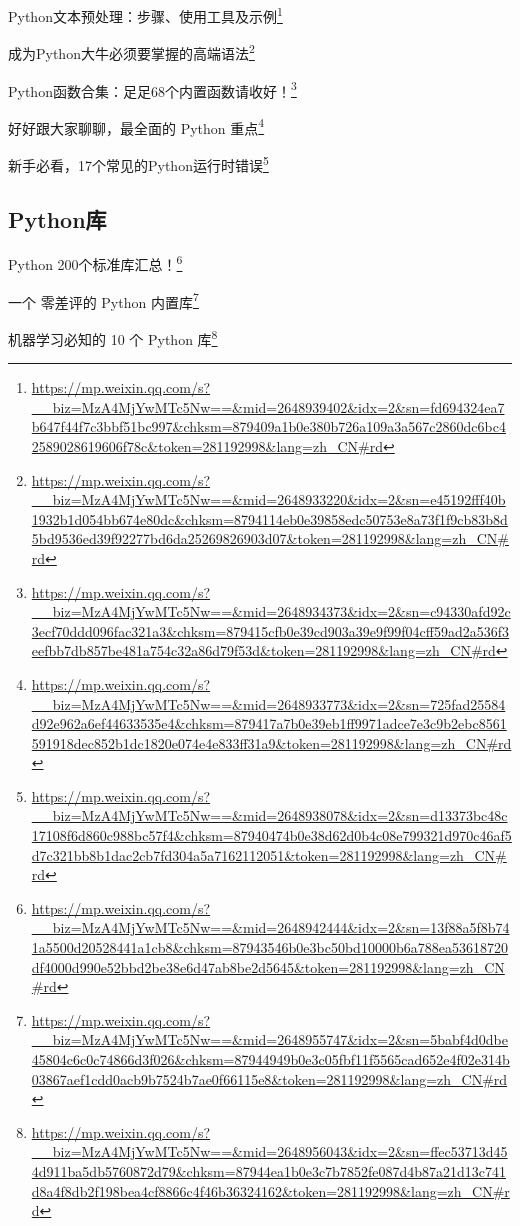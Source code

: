 \documentclass[]{ctexbook}
\renewcommand{\href}[2]{#2\footnote{\url{#1}}}
\begin{document}
\href{https://mp.weixin.qq.com/s?__biz=MzA4MjYwMTc5Nw==\&mid=2648939402\&idx=2\&sn=fd694324ea7b647f44f7c3bbf51bc997\&chksm=879409a1b0e380b726a109a3a567c2860dc6bc42589028619606f78c\&token=281192998\&lang=zh_CN\#rd}{Python文本预处理：步骤、使用工具及示例}

\href{https://mp.weixin.qq.com/s?__biz=MzA4MjYwMTc5Nw==\&mid=2648933220\&idx=2\&sn=e45192fff40b1932b1d054bb674e80dc\&chksm=8794114eb0e39858edc50753e8a73f1f9cb83b8d5bd9536ed39f92277bd6da25269826903d07\&token=281192998\&lang=zh_CN\#rd}{成为Python大牛必须要掌握的高端语法}

\href{https://mp.weixin.qq.com/s?__biz=MzA4MjYwMTc5Nw==\&mid=2648934373\&idx=2\&sn=c94330afd92c3ecf70ddd096fac321a3\&chksm=879415cfb0e39cd903a39e9f99f04cff59ad2a536f3eefbb7db857be481a754c32a86d79f53d\&token=281192998\&lang=zh_CN\#rd}{Python函数合集：足足68个内置函数请收好！}

\href{https://mp.weixin.qq.com/s?__biz=MzA4MjYwMTc5Nw==\&mid=2648933773\&idx=2\&sn=725fad25584d92e962a6ef44633535e4\&chksm=879417a7b0e39eb1ff9971adce7e3c9b2ebc8561591918dec852b1dc1820e074e4e833ff31a9\&token=281192998\&lang=zh_CN\#rd}{好好跟大家聊聊，最全面的 Python 重点}

\href{https://mp.weixin.qq.com/s?__biz=MzA4MjYwMTc5Nw==\&mid=2648938078\&idx=2\&sn=d13373bc48c17108f6d860c988bc57f4\&chksm=87940474b0e38d62d0b4c08e799321d970c46af5d7c321bb8b1dac2cb7fd304a5a7162112051\&token=281192998\&lang=zh_CN\#rd}{新手必看，17个常见的Python运行时错误}

\hypertarget{pythonux5e93}{%
\subsection{Python库}\label{pythonux5e93}}

\href{https://mp.weixin.qq.com/s?__biz=MzA4MjYwMTc5Nw==\&mid=2648942444\&idx=2\&sn=13f88a5f8b741a5500d20528441a1cb8\&chksm=87943546b0e3bc50bd10000b6a788ea53618720df4000d990e52bbd2be38e6d47ab8be2d5645\&token=281192998\&lang=zh_CN\#rd}{Python 200个标准库汇总！}

\href{https://mp.weixin.qq.com/s?__biz=MzA4MjYwMTc5Nw==\&mid=2648955747\&idx=2\&sn=5babf4d0dbe45804c6c0c74866d3f026\&chksm=87944949b0e3c05fbf11f5565cad652e4f02e314b03867aef1cdd0acb9b7524b7ae0f66115e8\&token=281192998\&lang=zh_CN\#rd}{一个 零差评的 Python 内置库}

\href{https://mp.weixin.qq.com/s?__biz=MzA4MjYwMTc5Nw==\&mid=2648956043\&idx=2\&sn=ffec53713d454d911ba5db5760872d79\&chksm=87944ea1b0e3c7b7852fe087d4b87a21d13c741d8a4f8db2f198bea4cf8866c4f46b36324162\&token=281192998\&lang=zh_CN\#rd}{机器学习必知的 10 个 Python 库}
\end{document}
